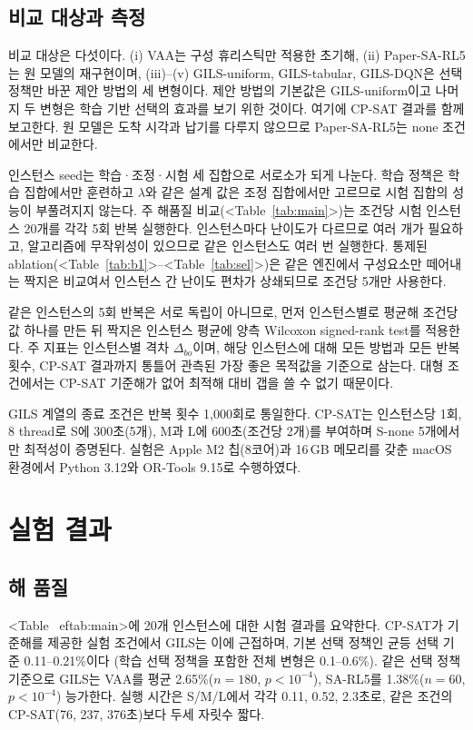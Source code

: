 \documentclass[10pt,a4paper]{article}
\begin{document}
\subsection{비교 대상과 측정}
비교 대상은 다섯이다. (i) VAA는 구성 휴리스틱만 적용한 초기해, (ii) Paper-SA-RL5는 원
모델의 재구현이며, (iii)--(v) GILS-uniform, GILS-tabular, GILS-DQN은 선택 정책만 바꾼 제안
방법의 세 변형이다. 제안 방법의 기본값은 GILS-uniform이고 나머지 두 변형은 학습 기반
선택의 효과를 보기 위한 것이다. 여기에 CP-SAT 결과를 함께 보고한다. 원 모델은 도착
시각과 납기를 다루지 않으므로 Paper-SA-RL5는 none 조건에서만 비교한다.

인스턴스 seed는 학습·조정·시험 세 집합으로 서로소가 되게 나눈다. 학습 정책은 학습
집합에서만 훈련하고 $\lambda$와 같은 설계 값은 조정 집합에서만 고르므로 시험 집합의
성능이 부풀려지지 않는다. 주 해품질 비교(<Table~\ref{tab:main}>)는 조건당 시험 인스턴스
20개를 각각 5회 반복 실행한다. 인스턴스마다 난이도가 다르므로 여러 개가 필요하고,
알고리즘에 무작위성이 있으므로 같은 인스턴스도 여러 번 실행한다. 통제된
ablation(<Table~\ref{tab:b1}>--<Table~\ref{tab:sel}>)은 같은 엔진에서 구성요소만 떼어내는
짝지은 비교여서 인스턴스 간 난이도 편차가 상쇄되므로 조건당 5개만 사용한다.

같은 인스턴스의 5회 반복은 서로 독립이 아니므로, 먼저 인스턴스별로 평균해 조건당 값
하나를 만든 뒤 짝지은 인스턴스 평균에 양측 Wilcoxon signed-rank test를 적용한다. 주
지표는 인스턴스별 격차 $\Delta_{bo}$이며, 해당 인스턴스에 대해 모든 방법과 모든 반복
횟수, CP-SAT 결과까지 통틀어 관측된 가장 좋은 목적값을 기준으로 삼는다. 대형 조건에서는
CP-SAT 기준해가 없어 최적해 대비 갭을 쓸 수 없기 때문이다.

GILS 계열의 종료 조건은 반복 횟수 1{,}000회로 통일한다. CP-SAT는 인스턴스당 1회, 8
thread로 S에 300초(5개), M과 L에 600초(조건당 2개)를 부여하며 S-none 5개에서만 최적성이
증명된다. 실험은 Apple M2 칩(8코어)과 16\,GB 메모리를 갖춘 macOS 환경에서 Python 3.12와 OR-Tools 9.15로 수행하였다.

\section{실험 결과}
\subsection{해 품질}
<Table~
ef{tab:main}>에 20개 인스턴스에 대한 시험 결과를 요약한다. CP-SAT가 기준해를 제공한
실험 조건에서 GILS는 이에 근접하며, 기본 선택 정책인 균등 선택 기준 0.11--0.21\%이다
(학습 선택 정책을 포함한 전체 변형은 0.1--0.6\%). 같은 선택 정책 기준으로 GILS는
VAA를 평균 2.65\%($n=180$, $p<10^{-4}$), SA-RL5를 1.38\%($n=60$, $p<10^{-4}$)
능가한다. 실행 시간은 S/M/L에서 각각 0.11, 0.52, 2.3초로, 같은 조건의
CP-SAT(76, 237, 376초)보다 두세 자릿수 짧다.
\end{document}

